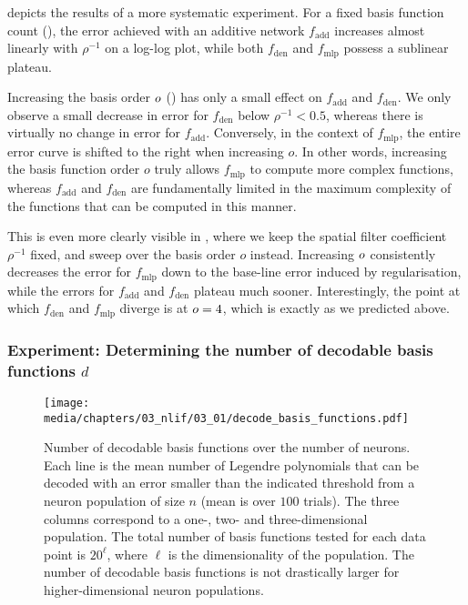  depicts the results of a more systematic experiment.
For a fixed basis function count (), the error achieved with an additive network $f_\mathrm{add}$ increases almost linearly with $\rho^{-1}$ on a log-log plot, while both $f_\mathrm{den}$ and $f_\mathrm{mlp}$ possess a sublinear plateau.

Increasing the basis order $o$ () has only a small effect on $f_\mathrm{add}$ and $f_\mathrm{den}$.
We only observe a small decrease in error for $f_\mathrm{den}$ below $\rho^{-1} < 0.5$, whereas there is virtually no change in error for $f_\mathrm{add}$.
Conversely, in the context of $f_\mathrm{mlp}$, the entire error curve is shifted to the right when increasing $o$.
In other words, increasing the basis function order $o$ truly allows $f_\mathrm{mlp}$ to compute more complex functions, whereas $f_\mathrm{add}$ and $f_\mathrm{den}$ are fundamentally limited in the maximum complexity of the functions that can be computed in this manner.

This is even more clearly visible in , where we keep the spatial filter coefficient $\rho^{-1}$ fixed, and sweep over the basis order $o$ instead.
Increasing $o$ consistently decreases the error for $f_\mathrm{mlp}$ down to the base-line error induced by regularisation, while the errors for $f_\mathrm{add}$ and $f_\mathrm{den}$ plateau much sooner.
Interestingly, the point at which $f_\mathrm{den}$ and $f_\mathrm{mlp}$ diverge is at $o = 4$, which is exactly as we predicted above.


\subsubsection{Experiment: Determining the number of decodable basis functions $d$}

\begin{figure}
	\centering
	\texttt{[image: media/chapters/03\_nlif/03\_01/decode\_basis\_functions.pdf]}
	\caption[Number of decodable basis functions over the number of neurons]{Number of decodable basis functions over the number of neurons. Each line is the mean number of Legendre polynomials  that can be decoded with an error smaller than the indicated threshold from a \ReLU neuron population of size $n$ (mean is over $100$ trials). The three columns correspond to a one-, two- and three-dimensional population. The total number of basis functions tested for each data point is $20^\ell$, where $\ell$ is the dimensionality of the population.
	The number of decodable basis functions is not drastically larger for higher-dimensional neuron populations.}
	\label{fig:decode_basis_functions}
\end{figure}

